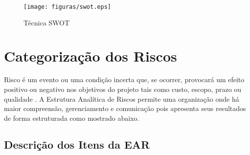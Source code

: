 \begin{figure}[!h]
 \centering
 \texttt{[image: figuras/swot.eps]}
 \caption{Técnica SWOT}
\end{figure}

\section{Categorização dos Riscos}
Risco é um evento ou uma condição incerta que, se ocorrer, provocará um efeito positivo ou negativo nos objetivos do projeto tais como custo, escopo, prazo ou qualidade \cite{bianco}. A Estrutura Analítica de Riscos permite uma organização onde há maior compreensão, gerenciamento e comunicação pois apresenta seus resultados de forma estruturada como mostrado abaixo.
\subsection{Descrição dos Itens da EAR}
